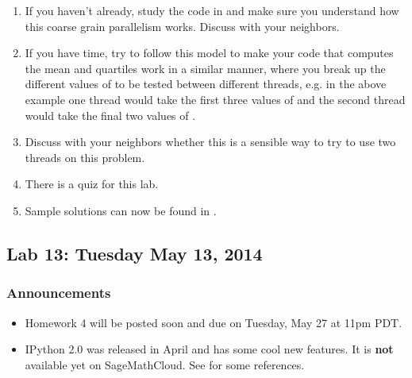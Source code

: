 \documentclass[letterpaper,10pt,english]{sphinxmanual}
\begin{document}
\begin{enumerate}
\item {} 
If you haven't already, study the code in
and make sure you understand how this coarse grain parallelism works.
Discuss with your neighbors.

\item {} 
If you have time, try to follow this model to make your code that
computes the mean and quartiles work in a similar manner, where you
break up the different values of  to be tested between different
threads, e.g. in the above example one thread would take the
first three values of  and the second thread would take the final
two values of .

\item {} 
Discuss with your neighbors whether this is a sensible way to try
to use two threads on this problem.

\item {} 
There is a quiz for this lab.

\item {} 
Sample solutions can now be found in .

\end{enumerate}


\subsection{Lab 13: Tuesday May 13, 2014}
\label{labs/lab13:lab13}\label{labs/lab13::doc}\label{labs/lab13:lab-13-tuesday-may-13-2014}

\subsubsection{Announcements}
\label{labs/lab13:announcements}\begin{itemize}
\item {} 
Homework 4 will be posted soon and due on Tuesday, May 27 at 11pm PDT.

\item {} 
IPython 2.0 was released in April and has some cool new features.
It is \textbf{not} available yet on SageMathCloud.
See {\hyperref[ipython_notebook:ipython\string-notebook]{}} for some references.

\end{itemize}
\end{document}

